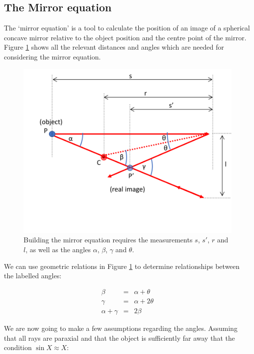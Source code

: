 \documentclass[
]{book}
\begin{document}
\hypertarget{sec-ch15-mirrorequ}{%
\subsection{The Mirror equation}\label{sec-ch15-mirrorequ}}

The `mirror equation' is a tool to calculate the position of an image of a spherical concave mirror relative to the object position and the centre point of the mirror. Figure \ref{fig:ch15-concavesphericalmirroreq1} shows all the relevant distances and angles which are needed for considering the mirror equation.

\begin{figure}

{\centering \includegraphics[width=0.7\linewidth]{visualisations/LaTeX/ch15-mirrorequation} 

}

\caption{Building the mirror equation requires the measurements $s$, $s'$, $r$ and $l$, as well as the angles $\alpha$, $\beta$, $\gamma$ and $\theta$.}\label{fig:ch15-concavesphericalmirroreq1}
\end{figure}

We can use geometric relations in Figure \ref{fig:ch15-concavesphericalmirroreq1} to determine relationships between the labelled angles:

\begin{equation}
\begin{array}{rcl}
\beta &=& \alpha + \theta \\
\gamma &=& \alpha + 2\theta \\
\alpha + \gamma &=& 2\beta
\end{array}
\end{equation}

We are now going to make a few assumptions regarding the angles. Assuming that all rays are paraxial and that the object is sufficiently far away that the condition \(\sin X \approx X\):
\end{document}
